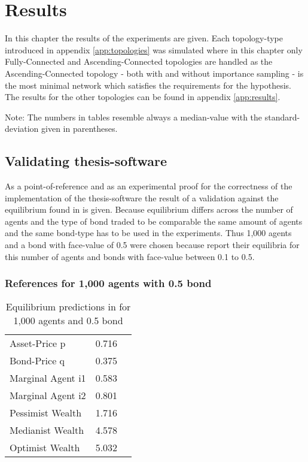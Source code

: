 \documentclass[Bachelorarbeit.tex]{subfiles}
\begin{document}
\graphicspath{{./figures/results/}}	%

\chapter{Results}
\label{ch:results}

In this chapter the results of the experiments are given. Each topology-type introduced in appendix \ref{app:topologies} was simulated where in this chapter only Fully-Connected and Ascending-Connected topologies are handled as the Ascending-Connected topology - both with and without importance sampling - is the most minimal network which satisfies the requirements for the hypothesis. The results for the other topologies can be found in appendix \ref{app:results}.

Note: The numbers in tables resemble always a median-value with the standard-deviation given in parentheses.

\section{Validating thesis-software}
As a point-of-reference and as an experimental proof for the correctness of the implementation of the thesis-software the result of a validation against the equilibrium found in \cite{Breuer2015} is given. Because equilibrium differs across the number of agents and the type of bond traded to be comparable the same amount of agents and the same bond-type has to be used in the experiments. Thus 1,000 agents and a bond with face-value of 0.5 were chosen because \cite{Breuer2015} report their equilibria for this number of agents and bonds with face-value between 0.1 to 0.5.

\subsection{References for 1,000 agents with 0.5 bond}

\begin{table}[H]
	\centering
	\caption{Equilibrium predictions in \cite{Breuer2015} for 1,000 agents and 0.5 bond}
	\begin{tabular} { l c r }
		\hline
		Asset-Price p & 0.716 \\
		Bond-Price q & 0.375 \\
		Marginal Agent i1 & 0.583 \\
		Marginal Agent i2 & 0.801 \\
		\hline
		Pessimist Wealth & 1.716 \\
		Medianist Wealth & 4.578 \\
		Optimist Wealth & 5.032 \\
		\hline
	\end{tabular}
	\label{tab:equilibrium_BREUER_1000}
\end{table}
\end{document}
